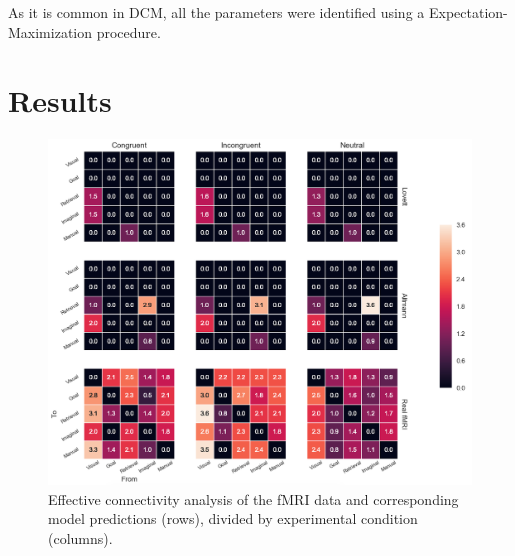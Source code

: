 \documentclass[10pt,letterpaper]{article}
\begin{document}
As it is common in DCM, all the parameters were identified using a Expectation-Maximization procedure. 

\section{Results}

\begin{figure}[ht]
\centering
 \includegraphics[width=6in]{9x9.png}
\caption{Effective connectivity analysis of the fMRI data and corresponding model predictions (rows), divided by experimental condition (columns).}
\label{fig:conn}
\end{figure}%
\end{document}
